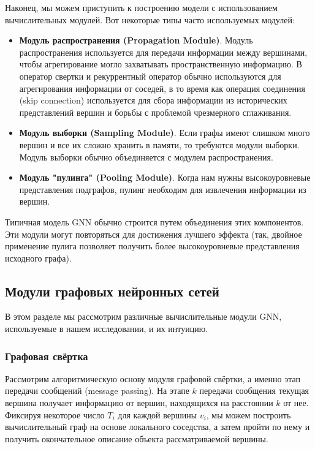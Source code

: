 \documentclass[12pt]{article}
\begin{document}
Наконец, мы можем приступить к построению модели с использованием вычислительных модулей. Вот некоторые типы часто используемых модулей: 

\begin{itemize}
    \item \textbf{Модуль распространения (Propagation Module)}. Модуль распространения используется для передачи информации между вершинами, чтобы агрегирование могло захватывать пространственную информацию. В оператор свертки и рекуррентный оператор обычно используются для агрегирования информации от соседей, в то время как операция соединения (skip connection) используется для сбора информации из исторических представлений вершин и борьбы с проблемой чрезмерного сглаживания. 
    
    \item \textbf{Модуль выборки (Sampling Module)}. Если графы имеют слишком много вершин и все их сложно хранить в памяти, то требуются модули выборки. Модуль выборки обычно объединяется с модулем распространения. 
    
    \item \textbf{Модуль "пулинга" (Pooling Module)}. Когда нам нужны высокоуровневые представления подграфов, пулинг необходим для извлечения информации из вершин.
\end{itemize}

Типичная модель GNN обычно строится путем объединения этих компонентов. Эти модули могут повторяться для достижения лучшего эффекта (так, двойное применение пулига позволяет получить более высокоуровневые представления исходного графа). 

\subsection{Модули графовых нейронных сетей}

В этом разделе мы рассмотрим различные вычислительные модули GNN, используемые в нашем исследовании, и их интуицию.

\subsubsection{Графовая свёртка}

Рассмотрим алгоритмическую основу модуля графовой свёртки, а именно этап передачи сообщений (message passing). На этапе $k$ передачи сообщения текущая вершина получает информацию от вершин, находящихся на расстоянии $k$ от нее. Фиксируя некоторое число $T_i$ для каждой вершины $v_i$, мы можем построить вычислительный граф на основе локального соседства, а затем пройти по нему и получить окончательное описание объекта рассматриваемой вершины.
\end{document}
